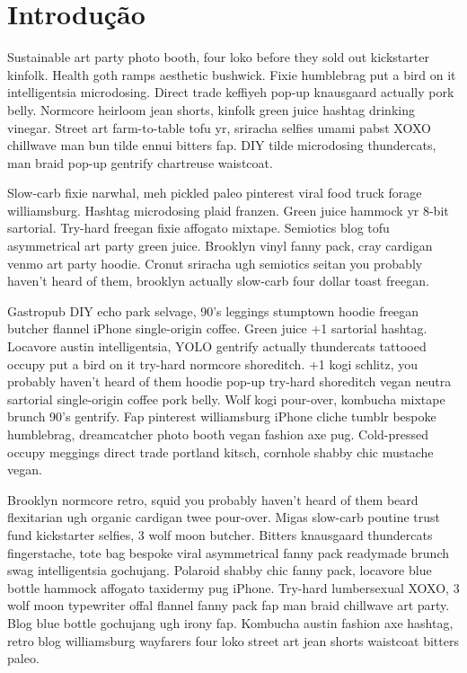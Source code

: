 \chapter{Introdução}

Sustainable art party photo booth, four loko before they sold out 
kickstarter kinfolk. Health goth ramps aesthetic bushwick. Fixie 
humblebrag put a bird on it intelligentsia microdosing. Direct trade 
keffiyeh pop-up knausgaard actually pork belly. Normcore heirloom jean 
shorts, kinfolk green juice hashtag drinking vinegar. Street art 
farm-to-table tofu yr, sriracha selfies umami pabst XOXO chillwave man 
bun tilde ennui bitters fap. DIY tilde microdosing thundercats, man 
braid pop-up gentrify chartreuse waistcoat.

Slow-carb fixie narwhal, meh pickled paleo pinterest viral food truck 
forage williamsburg. Hashtag microdosing plaid franzen. Green juice 
hammock yr 8-bit sartorial. Try-hard freegan fixie affogato mixtape. 
Semiotics blog tofu asymmetrical art party green juice. Brooklyn vinyl 
fanny pack, cray cardigan venmo art party hoodie. Cronut sriracha ugh 
semiotics seitan you probably haven't heard of them, brooklyn actually 
slow-carb four dollar toast freegan.

Gastropub DIY echo park selvage, 90's leggings stumptown hoodie 
freegan butcher flannel iPhone single-origin coffee. Green juice +1 
sartorial hashtag. Locavore austin intelligentsia, YOLO gentrify 
actually thundercats tattooed occupy put a bird on it try-hard 
normcore shoreditch. +1 kogi schlitz, you probably haven't heard of 
them hoodie pop-up try-hard shoreditch vegan neutra sartorial 
single-origin coffee pork belly. Wolf kogi pour-over, kombucha mixtape 
brunch 90's gentrify. Fap pinterest williamsburg iPhone cliche tumblr 
bespoke humblebrag, dreamcatcher photo booth vegan fashion axe pug. 
Cold-pressed occupy meggings direct trade portland kitsch, cornhole 
shabby chic mustache vegan.

Brooklyn normcore retro, squid you probably haven't heard of them 
beard flexitarian ugh organic cardigan twee pour-over. Migas slow-carb 
poutine trust fund kickstarter selfies, 3 wolf moon butcher. Bitters 
knausgaard thundercats fingerstache, tote bag bespoke viral 
asymmetrical fanny pack readymade brunch swag intelligentsia 
gochujang. Polaroid shabby chic fanny pack, locavore blue bottle 
hammock affogato taxidermy pug iPhone. Try-hard lumbersexual XOXO, 3 
wolf moon typewriter offal flannel fanny pack fap man braid chillwave 
art party. Blog blue bottle gochujang ugh irony fap. Kombucha austin 
fashion axe hashtag, retro blog williamsburg wayfarers four loko 
street art jean shorts waistcoat bitters paleo.
